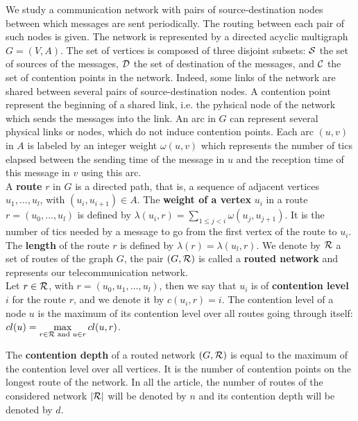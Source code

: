 \documentclass[english]{article}
\begin{document}
  We study a communication network with pairs of source-destination nodes between which messages are sent periodically. The routing between each  pair of such nodes is given. The network is represented by a directed acyclic multigraph $G=(V,A)$. The set of vertices is composed of three disjoint subsets:  ${\cal S}$ the set of sources of the messages, ${\cal D}$ the set of destination of the messages, and ${\cal C}$ the set of contention points in the network. Indeed, some links of the network are shared between several pairs of source-destination nodes. A contention point represent the beginning of a shared link, i.e. the pyhsical node of the network which sends the messages into the link. An arc in $G$ can represent several physical links or nodes, which do not induce contention points. Each arc  $(u,v)$ in $A$ is labeled by an integer weight $\omega(u,v)$ which represents the number of tics elapsed between the sending time of the message in $u$ and the reception time of this message in $v$ using this arc. \\
  A {\bf route} $r$ in $G$ is a directed path, that is, a sequence of adjacent vertices $u_1, \ldots , u_{l}$, with $(u_i,u_{i+1}) \in A$.  The {\bf weight of a vertex} $u_i$ in a route $r=(u_0,\dots,u_l)$ is defined by $\lambda(u_i,r)= \sum\limits_{1 \leq j <i} \omega(u_j, u_{j+1})$. It is the number of tics needed by a message to go from the first vertex of the route to $u_i$. The \textbf{length} of the route $r$ is defined by $\lambda (r)= \lambda (u_l,r)$.
	We denote by ${\cal R}$ a set of routes of the graph $G$, the pair $(G,{\cal R})$ is called a \textbf{routed network} and represents our telecommunication network.\\
	Let $r \in {\cal R}$, with $r = (u_0,u_1,\dots,u_l)$, then we say that $u_i$ is of \textbf{contention level} $i$ for the route $r$, and we denote it by $c(u_i,r) = i$. The contention level of a node $u$ is the maximum of its contention level over all routes going through itself: 
	$cl(u) = \max\limits_{r\in{\cal R} \text{ and } u \in r} cl(u,r)$.


	The  \textbf{contention depth} of a routed network $(G,{\cal R})$ is equal to the maximum of the contention level over all vertices. It is the number of contention points on the longest route of the network. In all the article, the number of routes
	of the considered network $|\cal{R}|$ will be denoted by $n$ and its contention depth will be denoted by $d$.
\end{document}
